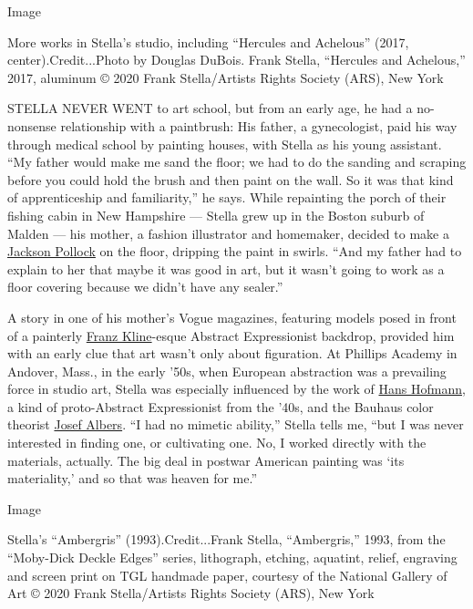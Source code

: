 Image

More works in Stella's studio, including ``Hercules and Achelous''
(2017, center).Credit...Photo by Douglas DuBois. Frank Stella,
``Hercules and Achelous,'' 2017, aluminum © 2020 Frank Stella/Artists
Rights Society (ARS), New York

STELLA NEVER WENT to art school, but from an early age, he had a
no-nonsense relationship with a paintbrush: His father, a gynecologist,
paid his way through medical school by painting houses, with Stella as
his young assistant. ``My father would make me sand the floor; we had to
do the sanding and scraping before you could hold the brush and then
paint on the wall. So it was that kind of apprenticeship and
familiarity,'' he says. While repainting the porch of their fishing
cabin in New Hampshire --- Stella grew up in the Boston suburb of Malden
--- his mother, a fashion illustrator and homemaker, decided to make a
\href{https://www.nytimes3xbfgragh.onion/topic/person/jackson-pollock}{Jackson
Pollock} on the floor, dripping the paint in swirls. ``And my father had
to explain to her that maybe it was good in art, but it wasn't going to
work as a floor covering because we didn't have any sealer.''

A story in one of his mother's Vogue magazines, featuring models posed
in front of a painterly
\href{https://www.artsy.net/artist/franz-kline}{Franz Kline}-esque
Abstract Expressionist backdrop, provided him with an early clue that
art wasn't only about figuration. At Phillips Academy in Andover, Mass.,
in the early '50s, when European abstraction was a prevailing force in
studio art, Stella was especially influenced by the work of
\href{https://www.nytimes3xbfgragh.onion/2015/05/14/nyregion/a-connecticut-exhibit-highlights-the-murals-of-hans-hofmann.html}{Hans
Hofmann}, a kind of proto-Abstract Expressionist from the '40s, and the
Bauhaus color theorist
\href{https://www.nytimes3xbfgragh.onion/1976/03/26/archives/josef-albers-artist-and-teacher-dies.html}{Josef
Albers}. ``I had no mimetic ability,'' Stella tells me, ``but I was
never interested in finding one, or cultivating one. No, I worked
directly with the materials, actually. The big deal in postwar American
painting was `its materiality,' and so that was heaven for me.''

Image

Stella's ``Ambergris'' (1993).Credit...Frank Stella, ``Ambergris,''
1993, from the ``Moby-Dick Deckle Edges'' series, lithograph, etching,
aquatint, relief, engraving and screen print on TGL handmade paper,
courtesy of the National Gallery of Art © 2020 Frank Stella/Artists
Rights Society (ARS), New York

